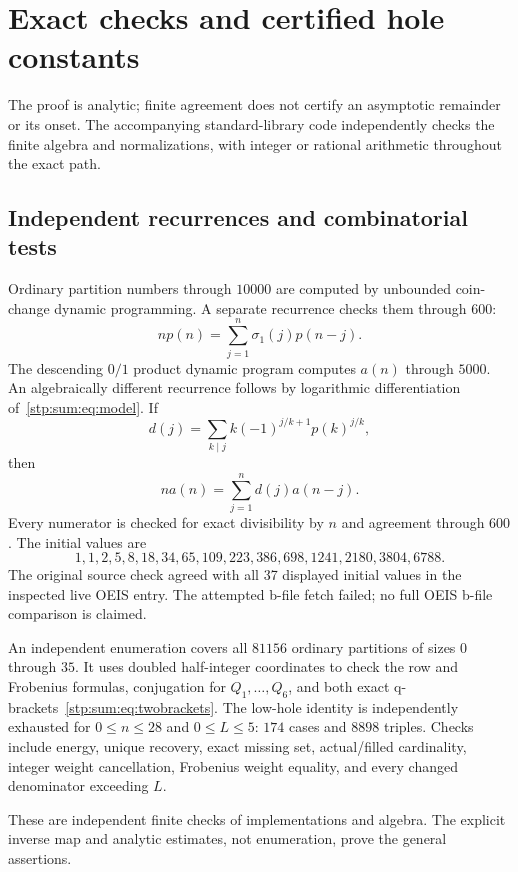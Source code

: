 \documentclass[11pt]{article}
\theoremstyle{remark}\newtheorem{remark}[theorem]{Remark}
\begin{document}
\section{Exact checks and certified hole constants}
\label{stp:sum:sec:computation}
The proof is analytic; finite agreement does not certify an asymptotic remainder or its onset. The accompanying standard-library code independently checks the finite algebra and normalizations, with integer or rational arithmetic throughout the exact path.

\subsection{Independent recurrences and combinatorial tests}
Ordinary partition numbers through $10000$ are computed by unbounded coin-change dynamic programming. A separate recurrence checks them through $600$:
\[
 np(n)=\sum_{j=1}^n\sigma_1(j)p(n-j).
\]
The descending $0/1$ product dynamic program computes $a(n)$ through $5000$. An algebraically different recurrence follows by logarithmic differentiation of~\eqref{stp:sum:eq:model}. If
\[
 d(j)=\sum_{k\mid j}k(-1)^{j/k+1}p(k)^{j/k},
\]
then
\[
 na(n)=\sum_{j=1}^n d(j)a(n-j).
\]
Every numerator is checked for exact divisibility by $n$ and agreement through $600$. The initial values are
\[
 1,1,2,5,8,18,34,65,109,223,386,698,1241,2180,3804,6788.
\]
The original source check agreed with all 37 displayed initial values in the inspected live OEIS entry. The attempted b-file fetch failed; no full OEIS b-file comparison is claimed.

An independent enumeration covers all $81156$ ordinary partitions of sizes $0$ through $35$. It uses doubled half-integer coordinates to check the row and Frobenius formulas, conjugation for $Q_1,\ldots,Q_6$, and both exact q-brackets~\eqref{stp:sum:eq:twobrackets}. The low-hole identity is independently exhausted for $0\le n\le28$ and $0\le L\le5$: $174$ cases and $8898$ triples. Checks include energy, unique recovery, exact missing set, actual/filled cardinality, integer weight cancellation, Frobenius weight equality, and every changed denominator exceeding $L$.

These are independent finite checks of implementations and algebra. The explicit inverse map and analytic estimates, not enumeration, prove the general assertions.
\end{document}
